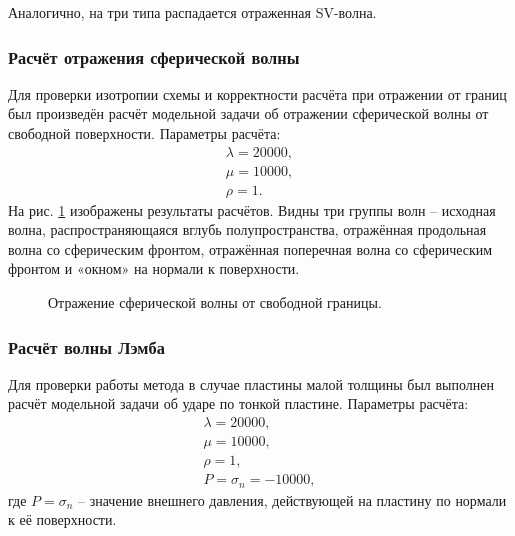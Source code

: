 Аналогично, на три типа распадается отраженная SV-волна. 


\subsubsection{Расчёт отражения сферической волны}
Для проверки изотропии схемы и корректности расчёта при отражении от границ был произведён расчёт модельной задачи об отражении сферической волны от свободной поверхности. Параметры расчёта:
\begin{eqnarray}
\lambda=20000, \\
\mu=10000, \\
\rho=1.
\end{eqnarray}
На рис. \ref{pic:sphere_wave_reflection_2d} изображены результаты расчётов. Видны три группы волн -- исходная волна, распространяющаяся вглубь полупространства, отражённая продольная волна со сферическим фронтом, отражённая поперечная волна со сферическим фронтом и «окном» на нормали к поверхности.

\begin{figure}[h]
\caption{Отражение сферической волны от свободной границы.}
\label{pic:sphere_wave_reflection_2d}
\end{figure}

\clearpage
\newpage

\subsubsection{Расчёт волны Лэмба}

Для проверки работы метода в случае пластины малой толщины был выполнен расчёт модельной задачи об ударе по тонкой пластине. Параметры расчёта:
\begin{eqnarray}
\lambda=20000, \\
\mu=10000, \\
\rho=1, \\
P = \sigma_n = -10000,
\end{eqnarray}
где $P = \sigma_n$ -- значение внешнего давления, действующей на пластину по нормали к её поверхности.

